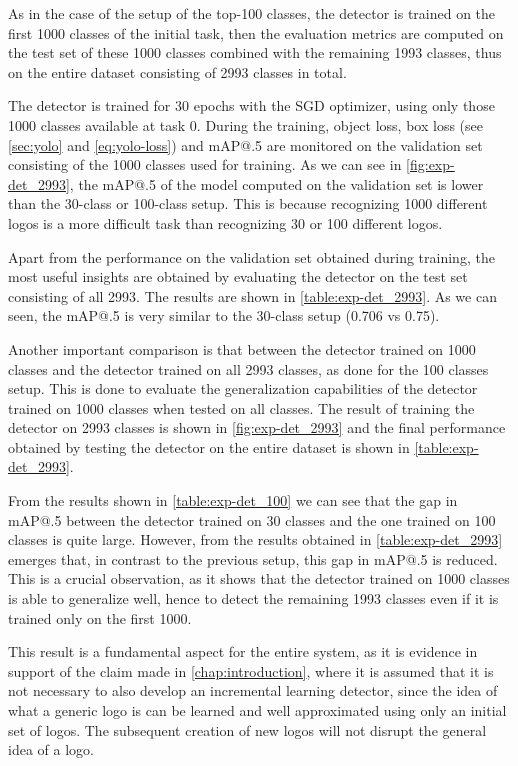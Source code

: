 As in the case of the setup of the top-100 classes, the detector is trained on the first 1000 classes of the initial task, then the evaluation metrics are computed on the test set of these 1000 classes combined with the remaining 1993 classes, thus on the entire dataset consisting of 2993 classes in total.

The detector is trained for 30 epochs with the SGD optimizer, using only those 1000 classes available at task 0.
During the training, object loss, box loss (see \autoref{sec:yolo} and \autoref{eq:yolo-loss}) and mAP@.5 are monitored on the validation set consisting of the 1000 classes used for training.
As we can see in \autoref{fig:exp-det_2993}, the mAP@.5 of the model computed on the validation set is lower than the 30-class or 100-class setup.
This is because recognizing 1000 different logos is a more difficult task than recognizing 30 or 100 different logos.

Apart from the performance on the validation set obtained during training, the most useful insights are obtained by evaluating the detector on the test set consisting of all 2993. The results are shown in \autoref{table:exp-det_2993}. As we can seen, the mAP@.5 is very similar to the 30-class setup (0.706 vs 0.75).

Another important comparison is that between the detector trained on 1000 classes and the detector trained on all 2993 classes, as done for the 100 classes setup.
This is done to evaluate the generalization capabilities of the detector trained on 1000 classes when tested on all classes. The result of training the detector on 2993 classes is shown in \autoref{fig:exp-det_2993} and the final performance obtained by testing the detector on the entire dataset is shown in \autoref{table:exp-det_2993}.

From the results shown in \autoref{table:exp-det_100} we can see that the gap in mAP@.5 between the detector trained on 30 classes and the one trained on 100 classes is quite large. However, from the results obtained in \autoref{table:exp-det_2993} emerges that, in contrast to the previous setup, this gap in mAP@.5 is reduced.
This is a crucial observation, as it shows that the detector trained on 1000 classes is able to generalize well, hence to detect the remaining 1993 classes even if it is trained only on the first 1000.

This result is a fundamental aspect for the entire system, as it is evidence in support of the claim made in \autoref{chap:introduction}, where it is assumed that it is not necessary to also develop an incremental learning detector, since the idea of what a generic logo is can be learned and well approximated using only an initial set of logos. The subsequent creation of new logos will not disrupt the general idea of a logo.

